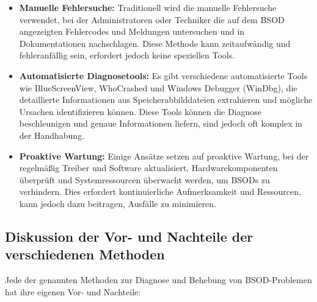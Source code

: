 \documentclass[paper=a4,fontsize=12pt,ngerman,parskip=half]{scrartcl}
\begin{document}
\begin{itemize}
  \item \textbf{Manuelle Fehlersuche:} Traditionell wird die manuelle Fehlersuche verwendet, bei der Administratoren oder Techniker die auf dem BSOD angezeigten Fehlercodes und Meldungen untersuchen und in Dokumentationen nachschlagen. Diese Methode kann zeitaufwändig und fehleranfällig sein, erfordert jedoch keine speziellen Tools.
  \item \textbf{Automatisierte Diagnosetools:} Es gibt verschiedene automatisierte Tools wie BlueScreenView, WhoCrashed und Windows Debugger (WinDbg), die detaillierte Informationen aus Speicherabbilddateien extrahieren und mögliche Ursachen identifizieren können. Diese Tools können die Diagnose beschleunigen und genaue Informationen liefern, sind jedoch oft komplex in der Handhabung.\cite{microsoft_support}
  \item \textbf{Proaktive Wartung:} Einige Ansätze setzen auf proaktive Wartung, bei der regelmäßig Treiber und Software aktualisiert, Hardwarekomponenten überprüft und Systemressourcen überwacht werden, um BSODs zu verhindern. Dies erfordert kontinuierliche Aufmerksamkeit und Ressourcen, kann jedoch dazu beitragen, Ausfälle zu minimieren.\cite{microsoft_forum}
\end{itemize}

\subsection{Diskussion der Vor- und Nachteile der verschiedenen Methoden}

Jede der genannten Methoden zur Diagnose und Behebung von BSOD-Problemen hat ihre eigenen Vor- und Nachteile:
\end{document}
